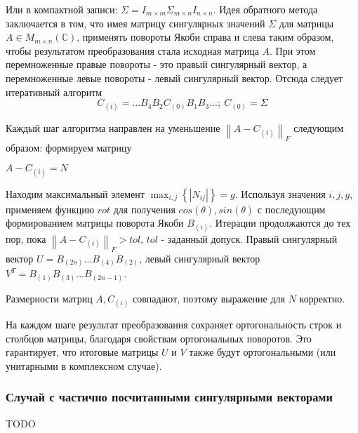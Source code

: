Или в компактной записи: $\Sigma = I_{m\times m}\Sigma_{m\times n}I_{n\times n}$.
Идея обратного метода заключается в том, что имея матрицу сингулярных значений $\Sigma$ для матрицы $A\in M_{m\times n}(\mathbb{C})$, применять повороты Якоби справа и слева таким образом, чтобы результатом преобразования стала исходная матрица $A$. При этом перемноженные правые повороты - это правый сингулярный вектор, а перемноженные левые повороты - левый сингулярный вектор. Отсюда следует итеративный алгоритм
\begin{equation}
    C_{(i)}=...B_4B_2C_{(0)}B_1B_3...;\ C_{(0)} = \Sigma
\end{equation}

Каждый шаг алгоритма направлен на уменьшение $\left\|  A-C_{(i)}\right\|_F$ следующим образом: формируем матрицу 
\begin{center}
    $A-C_{(i)} = N$
\end{center}
Находим максимальный элемент $\displaystyle\max_{i,j}\left\{ \left| N_{ij} \right| \right\} = g$. Используя значения $i,j,g$, применяем функцию $rot$ для получения $cos(\theta),sin(\theta)$ с последующим формированием матрицы поворота Якоби $B_{(i)}$. Итерации продолжаются до тех пор, пока $\left\|  A-C_{(i)}\right\|_F >tol$, $tol$ - заданный допуск. Правый сингулярный вектор $U = B_{(2n)}...B_{(4)}B_{(2)}$, левый сингулярный вектор $V^T = B_{(1)}B_{(3)}...B_{(2n-1)}$.

\begin{note}
    Размерности матриц $A, C_{(i)}$ совпадают, поэтому выражение для $N$ корректно.
\end{note}
\begin{note}
    На каждом шаге результат преобразования сохраняет ортогональность строк и столбцов матрицы, благодаря свойствам ортогональных поворотов. Это гарантирует, что итоговые матрицы $U$ и $V$ также будут ортогональными (или унитарными в комплексном случае).
\end{note}

\subsubsection{Случай с частично посчитанными сингулярными векторами}

TODO

